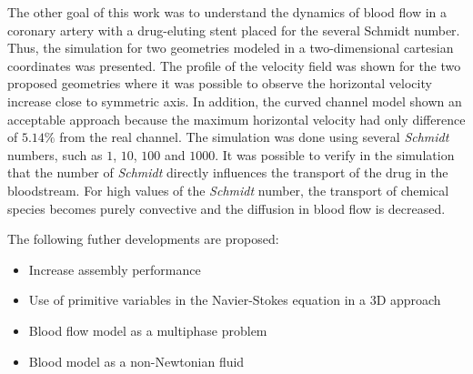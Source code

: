 \medskip
The other goal of this work was to understand the dynamics of blood 
flow in a coronary artery with 
a drug-eluting stent placed for the several Schmidt number. Thus, the simulation for two geometries 
modeled in a two-dimensional cartesian coordinates was presented. 
The profile of the velocity field was shown for the two proposed 
geometries where it was possible to observe the horizontal
velocity increase close to symmetric axis. In addition,
the curved channel model shown an acceptable approach because
the maximum horizontal velocity had only difference of $5.14\%$ 
from the real channel.  
The simulation was done using several \textit{Schmidt} numbers, 
such as $1$, $10$, $100$ and $1000$. It was possible to verify in the 
simulation that the number of \textit{Schmidt} directly influences 
the transport of the drug in the bloodstream. For high values of 
the \textit{Schmidt} number, the transport of chemical species 
becomes purely convective and the diffusion in blood flow is decreased. 

\vspace{0.7cm}
\noindent
The following futher developments are proposed:

\begin{itemize}
 \vspace{-0.3cm}
 \item Increase assembly performance

 \item Use of primitive variables in the Navier-Stokes equation in a 3D approach
 
 \item Blood flow model as a multiphase problem

 \item Blood model as a non-Newtonian fluid
\end{itemize}








